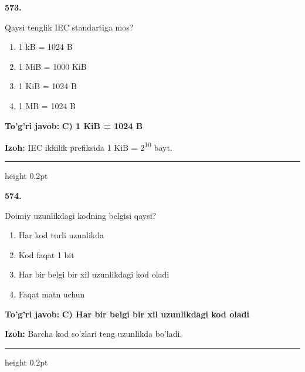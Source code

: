 \documentclass[10pt,a4paper,oneside]{article}
\begin{document}
\noindent\textbf{\color{ink}573.}
\par
Qaysi tenglik IEC standartiga mos?
\begin{enumerate}[label=\Alph*),leftmargin=9mm]
\item 1 kB = 1024 B
\item 1 MiB = 1000 KiB
\item 1 KiB = 1024 B
\item 1 MB = 1024 B
\end{enumerate}
\begin{tcolorbox}[enhanced,breakable,colback=teal!4,colframe=teal!50!black,boxrule=0.5pt,arc=1.1mm,left=3mm,right=3mm,top=1.7mm,bottom=1.7mm,before skip=2mm,after skip=2mm]
\textbf{\color{teal}To'g'ri javob:} \textbf{C) 1 KiB = 1024 B}
\par\smallskip
\textbf{Izoh:} IEC ikkilik prefiksida 1 KiB = 2\textsuperscript{1}\textsuperscript{0} bayt.
\end{tcolorbox}
\vspace{2mm}\hrule height 0.2pt \vspace{3mm}

\noindent\textbf{\color{ink}574.}
\par
Doimiy uzunlikdagi kodning belgisi qaysi?
\begin{enumerate}[label=\Alph*),leftmargin=9mm]
\item Har kod turli uzunlikda
\item Kod faqat 1 bit
\item Har bir belgi bir xil uzunlikdagi kod oladi
\item Faqat matn uchun
\end{enumerate}
\begin{tcolorbox}[enhanced,breakable,colback=teal!4,colframe=teal!50!black,boxrule=0.5pt,arc=1.1mm,left=3mm,right=3mm,top=1.7mm,bottom=1.7mm,before skip=2mm,after skip=2mm]
\textbf{\color{teal}To'g'ri javob:} \textbf{C) Har bir belgi bir xil uzunlikdagi kod oladi}
\par\smallskip
\textbf{Izoh:} Barcha kod so'zlari teng uzunlikda bo'ladi.
\end{tcolorbox}
\vspace{2mm}\hrule height 0.2pt \vspace{3mm}
\end{document}
